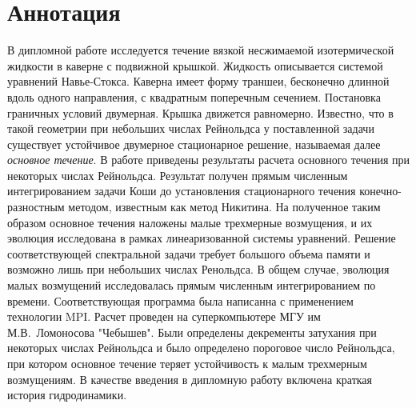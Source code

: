 \documentclass{scrartcl}
\begin{document}
\section{Аннотация}
  В дипломной работе исследуется течение вязкой несжимаемой изотермической жидкости в каверне с подвижной крышкой. 
  Жидкость описывается системой уравнений Навье-Стокса. Каверна имеет форму траншеи, бесконечно длинной 
  вдоль одного направления, с квадратным поперечным сечением. Постановка граничных условий двумерная. 
  Крышка движется равномерно. Известно, что в такой геометрии при небольших числах Рейнольдса у поставленной задачи
  существует устойчивое двумерное стационарное решение, называемая далее \textit{основное течение}. В работе приведены результаты
  расчета основного течения при некоторых числах Рейнольдса. Результат получен прямым численным интегрированием задачи 
  Коши до установления стационарного течения конечно-разностным методом, известным как метод Никитина. 
  На полученное таким образом основное течения наложены малые 
  трехмерные возмущения, и их эволюция исследована в рамках линеаризованной системы уравнений. Решение 
  соответствующей спектральной задачи требует большого объема памяти и возможно лишь при небольших числах Ренольдса.
  В общем случае, эволюция малых возмущений исследовалась прямым численным интегрированием по времени. 
  Соответствующая программа была написанна с применением технологии MPI. Расчет проведен на суперкомпьютере 
  МГУ им М.В.~Ломоносова "Чебышев". Были определены декременты затухания при некоторых числах Рейнольдса и было 
  определено пороговое число Рейнольдса, при котором основное течение теряет устойчивость к малым трехмерным возмущениям. 
  В качестве введения в дипломную работу включена краткая история гидродинамики.

\newpage  
  
  
%  
%  
  
  
%  
  
%  
  
\end{document}

